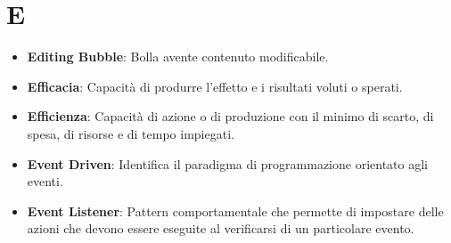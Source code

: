 \section*{E}
\begin{itemize}
	\item
	\textbf{Editing Bubble}: Bolla avente contenuto modificabile.
	\item
	\textbf{Efficacia}: Capacità di produrre l'effetto e i risultati voluti o sperati.
	\item
	\textbf{Efficienza}: Capacità di azione o di produzione con il minimo di scarto, di spesa, di risorse e di tempo impiegati.
	\item
	\textbf{Event Driven}: Identifica il paradigma di programmazione orientato agli eventi.
	\item
	\textbf{Event Listener}: Pattern comportamentale che permette di impostare delle azioni che devono essere eseguite al verificarsi di un particolare evento.
\end{itemize}
\newpage